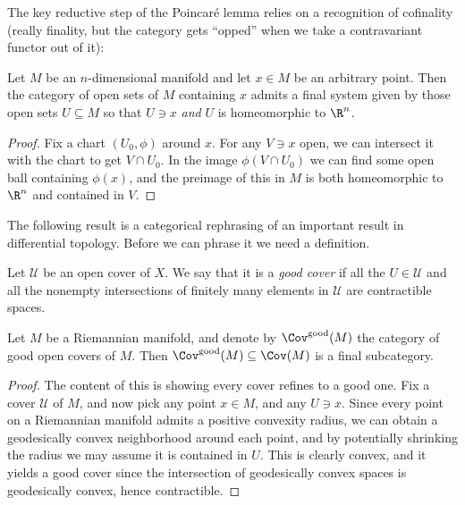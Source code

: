 \documentclass[11pt]{book}
\begin{document}
The key reductive step of the Poincar\'e lemma relies on a recognition of cofinality (really finality, but the category gets ``opped'' when we take a contravariant functor out of it):

\begin{proposition}\label{prop:manifold-stalk-cofinal-system} Let $M$ be an $n$-dimensional manifold and let $x\in M$ be an arbitrary point. Then the category of open sets of $M$ containing $x$ admits a final system given by those open sets $U \subseteq M$ so that $U\ni x$ \emph{and} $U$ is homeomorphic to $\R^n$.
\end{proposition}
\begin{proof} Fix a chart $(U_0,\phi)$ around $x$. For any $V \ni x$ open, we can intersect it with the chart to get $V \cap U_0$. In the image $\phi(V\cap U_0)$ we can find some open ball containing $\phi(x)$, and the preimage of this in $M$ is both homeomorphic to $\R^n$ and contained in $V$.
\end{proof}

The following result is a categorical rephrasing of an important result in differential topology. Before we can phrase it we need a definition.

\begin{definition}\label{def:good-cover} Let $\mathcal{U}$ be an open cover of $X$. We say that it is a \emph{good cover} if all the $U\in \mathcal{U}$ and all the nonempty intersections of finitely many elements in $\mathcal{U}$ are contractible spaces.
\end{definition}

\begin{proposition}\label{prop:good-covers-final-in-covers-on-mfld} Let $M$ be a Riemannian manifold, and denote by $\Cov^\text{good}(M)$ the category of good open covers of $M$. Then $\Cov^\text{good}(M) \subseteq \Cov(M)$ is a final subcategory.
\end{proposition}
\begin{proof} The content of this is showing every cover refines to a good one. Fix a cover $\mathcal{U}$ of $M$, and now pick any point $x\in M$, and any $U \ni x$. Since every point on a Riemannian manifold admits a positive convexity radius, we can obtain a geodesically convex neighborhood around each point, and by potentially shrinking the radius we may assume it is contained in $U$. This is clearly convex, and it yields a good cover since the intersection of geodesically convex spaces is geodesically convex, hence contractible.
\end{proof}
\end{document}

